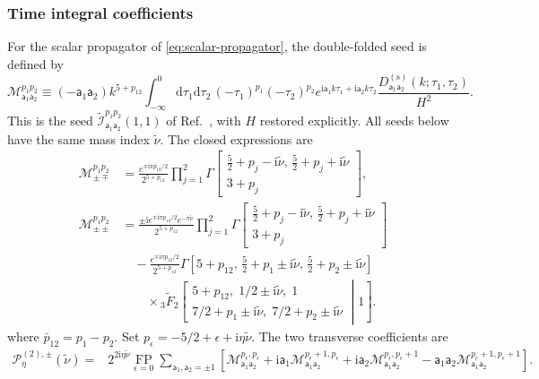 \documentclass[a4paper,12pt]{article}
\def\di{{\mathrm{d}}}
\def\ii{\mathrm{i}}
\def\aa{\mathsf{a}}
\begin{document}
\subsubsection{Time integral coefficients}
For the scalar propagator of \eqref{eq:scalar-propagator}, the double-folded seed is defined by
\begin{equation}
    \mathcal M_{\aa_1\aa_2}^{p_1p_2}
    \equiv(-\aa_1\aa_2)k^{5+p_{12}}
    \int_{-\infty}^0\di\tau_1\di\tau_2\,
    (-\tau_1)^{p_1}(-\tau_2)^{p_2}
    e^{\ii\aa_1 k\tau_1+\ii\aa_2 k\tau_2}
    \frac{D^{(\mathrm{s})}_{\aa_1\aa_2}(k;\tau_1,\tau_2)}{H^2}.
    \label{eq:triangle-M-definition}
\end{equation}
This is the seed $\widetilde{\mathcal I}_{\aa_1\aa_2}^{p_1p_2}(1,1)$ of Ref.~\cite{qin_closed-form_2023}, with $H$ restored explicitly.
All seeds below have the same mass index $\tilde\nu$.
The closed expressions are
\begin{align}
    \mathcal M_{\pm\mp}^{p_1p_2}
    &=\frac{e^{\mp\ii\pi\bar p_{12}/2}}{2^{5+p_{12}}}
    \prod_{j=1}^{2}
    \Gamma\!\left[\begin{matrix}
    \tfrac52+p_j-\ii\tilde\nu,\,\tfrac52+p_j+\ii\tilde\nu\\
    3+p_j
    \end{matrix}\right],
    \label{eq:triangle-M-opposite}\\
    \mathcal M_{\pm\pm}^{p_1p_2}
    &=\frac{\pm\ii e^{\mp\ii\pi p_{12}/2}e^{-\pi\tilde\nu}}
    {2^{5+p_{12}}}
    \prod_{j=1}^{2}
    \Gamma\!\left[\begin{matrix}
    \tfrac52+p_j-\ii\tilde\nu,\,\tfrac52+p_j+\ii\tilde\nu\\
    3+p_j
    \end{matrix}\right]
    \nonumber\\
    &\quad-\frac{e^{\mp\ii\pi p_{12}/2}}{2^{5+p_{12}}}
    \Gamma[5+p_{12},\,\tfrac52+p_1\pm\ii\tilde\nu,\,
    \tfrac52+p_2\pm\ii\tilde\nu]
    \nonumber\\
    &\qquad\times{}_3\widetilde F_2\left[
    \begin{matrix}
    5+p_{12},\;1/2\pm\ii\tilde\nu,\;1\\
    7/2+p_1\pm\ii\tilde\nu,\;7/2+p_2\pm\ii\tilde\nu
    \end{matrix}\middle|1\right].
    \label{eq:triangle-M-same}
\end{align}
where $\bar{p}_{12}=p_1-p_2$.
Set $p_\epsilon=-5/2+\epsilon+\ii\eta\tilde\nu$.
The two transverse coefficients are
\begin{align}
    \mathcal P^{(2),\pm}_{\eta}(\tilde\nu)
    ={}&2^{2\ii\eta\tilde\nu}
    \underset{\epsilon=0}{\operatorname{FP}}
    \sum_{\aa_1,\aa_2=\pm1}
    \left[
    \mathcal M_{\aa_1\aa_2}^{p_\epsilon,p_\epsilon}
    +\ii\aa_1\mathcal M_{\aa_1\aa_2}^{p_\epsilon+1,p_\epsilon}
    +\ii\aa_2\mathcal M_{\aa_1\aa_2}^{p_\epsilon,p_\epsilon+1}
    -\aa_1\aa_2\mathcal M_{\aa_1\aa_2}^{p_\epsilon+1,p_\epsilon+1}
    \right].
    \label{eq:triangle-P2-transverse}
\end{align}
\end{document}
